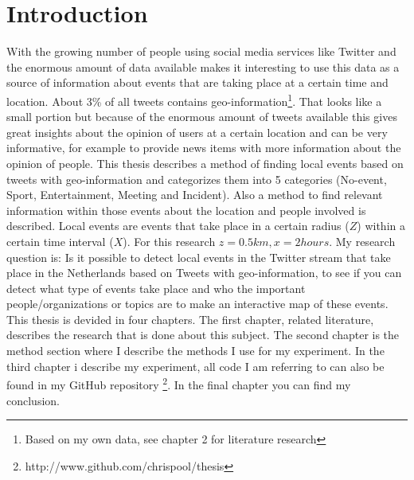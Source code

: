 \documentclass[
10pt, %
a4paper, %
oneside, %
headinclude,footinclude, %
BCOR5mm, %
]{scrartcl}
\begin{document}

\newpage %


\section{Introduction}

With the growing number of people using social media services like Twitter and the enormous amount of data available makes it interesting to use this data as a source of information about events that are taking place at a certain time and location. About 3\% of all tweets contains geo-information\footnote{Based on my own data, see chapter 2 for literature research}. That looks like a small portion but because of the enormous amount of tweets available this gives great insights about the opinion of users at a certain location and can be very informative, for example to provide news items with more information about the opinion of people. 
\vl
This thesis describes a method of finding local events based on tweets with geo-information and categorizes them into 5 categories (No-event, Sport, Entertainment, Meeting and Incident). Also a method to find relevant information within those events about the location and people involved is described. Local events are events that take place in a certain radius (\begin{math}Z\end{math}) within a certain time interval (\begin{math}X\end{math}). For this research \begin{math}z= 0.5km , x= 2 hours\end{math}. 
\vl
My research question is: Is it possible to detect local events in the Twitter stream that take place in the Netherlands based on Tweets with geo-information, to see if you can detect what type of events take place and who the important people/organizations or topics are to make an interactive map of these events.
\vl
This thesis is devided in four chapters. The first chapter, related literature, describes the research that is done about this subject. The second chapter is the method section where I describe the methods I use for my experiment. In the third chapter i describe my experiment, all code I am referring to can also be found in my GitHub repository \footnote{http://www.github.com/chrispool/thesis}. In the final chapter you can find my conclusion.
\newpage
\end{document}
